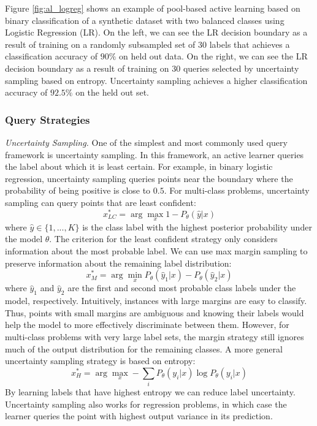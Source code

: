 Figure \ref{fig:al_logreg} shows an example of pool-based active learning based on binary classification of a synthetic dataset with two balanced classes using Logistic Regression (LR). On the left, we can see the LR decision boundary as a result of training on a randomly subsampled set of $30$ labels that achieves a classification accuracy of $90\%$ on held out data. On the right, we can see the LR decision boundary as a result of training on $30$ queries selected by uncertainty sampling based on entropy. Uncertainty sampling achieves a higher classification accuracy of $92.5\%$ on the held out set.   


\subsubsection{Query Strategies}

\textit{Uncertainty Sampling.} One of the simplest and most commonly used query framework is uncertainty sampling. In this framework, an active learner queries the label about which it is least certain. For example, in binary logistic regression, uncertainty sampling queries points near the boundary where the probability of being positive is close to $0.5$. For multi-class problems, uncertainty sampling can query points that are least confident:
\begin{equation}
    x_{LC}^{\ast} = \arg \max_x 1 - P_{\theta}(\hat{y}|x)
\end{equation}
where $\hat{y} \in \{1,...,K\}$ is the class label with the highest posterior probability under the model $\theta$. The criterion for the least confident strategy only considers information about the most probable label. We can use max margin sampling to preserve information about the remaining label distribution:
\begin{equation}
    x_{M}^{\ast} = \arg \min_x P_{\theta}(\hat{y}_1|x) - P_{\theta}(\hat{y}_2|x)
\end{equation}
where $\hat{y}_1$ and $\hat{y}_2$ are the first and second most probable class labels under the model, respectively. Intuitively, instances with large margins are easy to classify. Thus, points with small margins are ambiguous and knowing their labels would help the model to more effectively discriminate between them. However, for multi-class problems with very large label sets, the margin strategy still ignores much of the output distribution for the remaining classes. A more general uncertainty sampling strategy is based on entropy:
\begin{equation}
    x_{H}^{\ast} = \arg \max_x -\sum_i P_{\theta}(y_i|x)\log P_{\theta}(y_i|x)
\end{equation}
By learning labels that have highest entropy we can reduce label uncertainty. Uncertainty sampling also works for regression problems, in which case the learner queries the point with highest output variance in its prediction.\\

